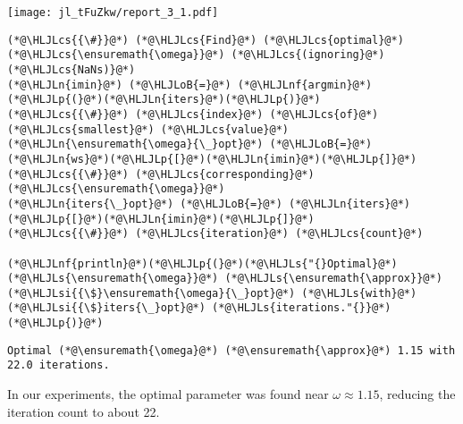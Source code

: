 \documentclass[12pt,a4paper]{article}
\newcommand{\HLJLn}[1]{#1}
\newcommand{\HLJLnf}[1]{\textcolor[RGB]{66,102,213}{#1}}
\newcommand{\HLJLs}[1]{\textcolor[RGB]{201,61,57}{#1}}
\newcommand{\HLJLsi}[1]{#1}
\newcommand{\HLJLoB}[1]{\textcolor[RGB]{102,102,102}{\textbf{#1}}}
\newcommand{\HLJLp}[1]{#1}
\newcommand{\HLJLcs}[1]{\textcolor[RGB]{153,153,119}{\textit{#1}}}
\begin{document}
\texttt{[image: jl\_tFuZkw/report\_3\_1.pdf]}

\begin{lstlisting}
(*@\HLJLcs{{\#}}@*) (*@\HLJLcs{Find}@*) (*@\HLJLcs{optimal}@*) (*@\HLJLcs{\ensuremath{\omega}}@*) (*@\HLJLcs{(ignoring}@*) (*@\HLJLcs{NaNs)}@*)
(*@\HLJLn{imin}@*) (*@\HLJLoB{=}@*) (*@\HLJLnf{argmin}@*)(*@\HLJLp{(}@*)(*@\HLJLn{iters}@*)(*@\HLJLp{)}@*)                (*@\HLJLcs{{\#}}@*) (*@\HLJLcs{index}@*) (*@\HLJLcs{of}@*) (*@\HLJLcs{smallest}@*) (*@\HLJLcs{value}@*)
(*@\HLJLn{\ensuremath{\omega}{\_}opt}@*) (*@\HLJLoB{=}@*) (*@\HLJLn{ws}@*)(*@\HLJLp{[}@*)(*@\HLJLn{imin}@*)(*@\HLJLp{]}@*)                    (*@\HLJLcs{{\#}}@*) (*@\HLJLcs{corresponding}@*) (*@\HLJLcs{\ensuremath{\omega}}@*)
(*@\HLJLn{iters{\_}opt}@*) (*@\HLJLoB{=}@*) (*@\HLJLn{iters}@*)(*@\HLJLp{[}@*)(*@\HLJLn{imin}@*)(*@\HLJLp{]}@*)             (*@\HLJLcs{{\#}}@*) (*@\HLJLcs{iteration}@*) (*@\HLJLcs{count}@*)

(*@\HLJLnf{println}@*)(*@\HLJLp{(}@*)(*@\HLJLs{"{}Optimal}@*) (*@\HLJLs{\ensuremath{\omega}}@*) (*@\HLJLs{\ensuremath{\approx}}@*) (*@\HLJLsi{{\$}\ensuremath{\omega}{\_}opt}@*) (*@\HLJLs{with}@*) (*@\HLJLsi{{\$}iters{\_}opt}@*) (*@\HLJLs{iterations."{}}@*)(*@\HLJLp{)}@*)
\end{lstlisting}

\begin{lstlisting}
Optimal (*@\ensuremath{\omega}@*) (*@\ensuremath{\approx}@*) 1.15 with 22.0 iterations.
\end{lstlisting}


In our experiments, the optimal parameter was found near $\omega \approx 1.15$, reducing the iteration count to about 22.  
\end{document}
